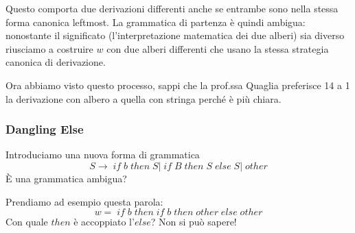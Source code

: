 \documentclass[class=book, crop=false, oneside, 12pt]{standalone}
\begin{document}
Questo comporta due derivazioni differenti anche se entrambe sono nella stessa forma canonica leftmost.
La grammatica di partenza è quindi ambigua: nonostante il significato (l'interpretazione matematica dei due alberi) sia diverso riusciamo a costruire \(w\) con due alberi differenti che usano la stessa strategia canonica di derivazione.

Ora abbiamo visto questo processo, sappi che la prof.ssa Quaglia preferisce 14 a 1 la derivazione con albero a quella con stringa perché è più chiara.

\subsubsection*{Dangling Else}
Introduciamo una nuova forma di grammatica
\begin{equation}
    S \to \; if \; b \; then \; S |\; if\; B\; then\; S\; else\; S |\; other
\end{equation}
È una grammatica ambigua?

Prendiamo ad esempio questa parola:
\begin{equation}
    \label{dangling_else}
    w =\; if\; b\; then\; if\; b\; then\; other\; else\; other
\end{equation}
Con quale \(then\) è accoppiato l’\(else\)? Non si può sapere!
\end{document}
